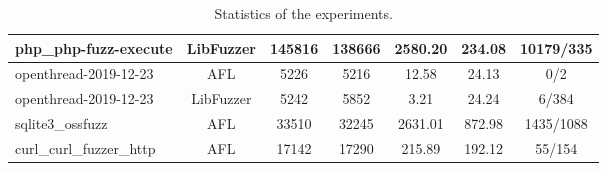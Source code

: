 \begin{table}
\begin{adjustbox}{angle=90}
{\begin{tabular}{|l|c|c|c|c|c|c|}
        \hline
        php\_php-fuzz-execute    & LibFuzzer & 145816                                                         & 138666                                                         & 2580.20                                              & 234.08                                               & 10179/335                                                         \\[2ex] 
        \hline
        openthread-2019-12-23    & AFL       & 5226                                                           & 5216                                                           & 12.58                                                & 24.13                                                & 0/2                                                               \\[2ex]
        \hline
        openthread-2019-12-23    & LibFuzzer & 5242                                                           & 5852                                                           & 3.21                                                 & 24.24                                                & 6/384                                                             \\[2ex]
        \hline
        sqlite3\_ossfuzz         & AFL       & 33510                                                          & 32245                                                          & 2631.01                                              & 872.98                                               & 1435/1088                                                         \\[2ex]
        \hline
        curl\_curl\_fuzzer\_http & AFL       & 17142                                                          & 17290                                                          & 215.89                                               & 192.12                                               & 55/154                                                            \\[2ex]
        \hline
        \end{tabular}}
    \end{adjustbox}
    \label{table:all}
    \caption{Statistics of the experiments.}
\end{table}

